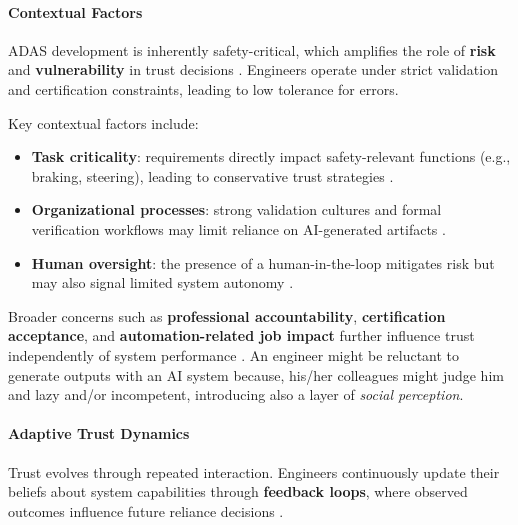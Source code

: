 \documentclass[sigconf]{acmart}
\begin{document}
\paragraph{Contextual Factors}

ADAS development is inherently safety-critical, which amplifies the role of \textbf{risk} and \textbf{vulnerability} in trust decisions \cite{ de_visser_longitudinal_trust}. Engineers operate under strict validation and certification constraints, leading to low tolerance for errors.

Key contextual factors include:

\begin{itemize}[leftmargin=*, label=\textbullet]
    \item \textbf{Task criticality}: requirements directly impact safety-relevant functions (e.g., braking, steering), leading to conservative trust strategies \cite{choudhury_asan_2020_trust_clinicians}.
    
    \item \textbf{Organizational processes}: strong validation cultures and formal verification workflows may limit reliance on AI-generated artifacts \cite{bach_systematic_literature_review}.
    
    \item \textbf{Human oversight}: the presence of a human-in-the-loop mitigates risk but may also signal limited system autonomy \cite{young_patient_systematic_review}.
\end{itemize}

Broader concerns such as \textbf{professional accountability}, \textbf{certification acceptance}, and \textbf{automation-related job impact} further influence trust independently of system performance \cite{ choudhury_chat_gpt}. An engineer might be reluctant to generate outputs with an AI system because, his/her colleagues might judge him and lazy and/or incompetent, introducing also a layer of \emph{social perception}.

\paragraph{Adaptive Trust Dynamics}

Trust evolves through repeated interaction. Engineers continuously update their beliefs about system capabilities through \textbf{feedback loops}, where observed outcomes influence future reliance decisions \cite{john_measurement_of_trust, de_visser_longitudinal_trust}.
\end{document}
